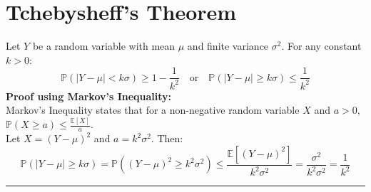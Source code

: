 \documentclass[11pt, letterpaper]{article}
\theoremstyle{definition}
\theoremstyle{remark}
\newcommand{\E}{\mathbb{E}}
\newcommand{\Prob}{\mathbb{P}}
\begin{document}
\vspace{1em}

\section{Tchebysheff's Theorem}
Let $Y$ be a random variable with mean $\mu$ and finite variance $\sigma^2$. For any constant $k > 0$:
\[ \Prob(|Y-\mu| < k\sigma) \ge 1 - \frac{1}{k^2} \quad \text{or} \quad \Prob(|Y-\mu| \ge k\sigma) \le \frac{1}{k^2} \]
\textbf{Proof using Markov's Inequality:} \\
Markov's Inequality states that for a non-negative random variable $X$ and $a > 0$, $\Prob(X \ge a) \le \frac{\E[X]}{a}$. \\
Let $X = (Y-\mu)^2$ and $a = k^2\sigma^2$. Then:
\[ \Prob(|Y-\mu| \ge k\sigma) = \Prob((Y-\mu)^2 \ge k^2\sigma^2) \le \frac{\E[(Y-\mu)^2]}{k^2\sigma^2} = \frac{\sigma^2}{k^2\sigma^2} = \frac{1}{k^2} \]

\vspace{1em}
\hrule
\vspace{1em}
\end{document}
